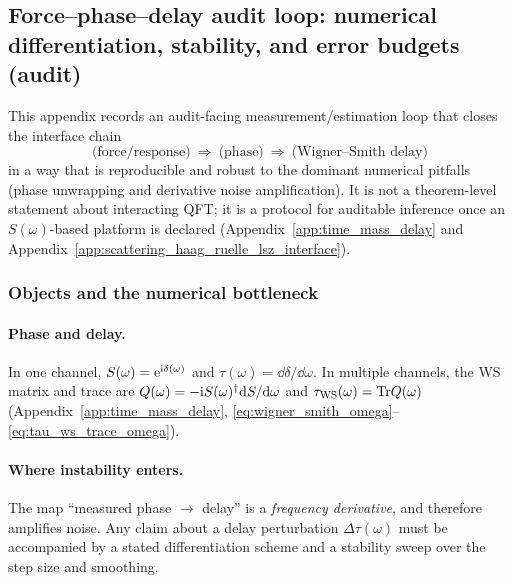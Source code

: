\subsection{Force--phase--delay audit loop: numerical differentiation, stability, and error budgets (audit)}
\label{app:force_phase_delay_audit}

This appendix records an audit-facing measurement/estimation loop that closes the interface chain
\[
\text{(force/response)}\ \Rightarrow\ \text{(phase)}\ \Rightarrow\ \text{(Wigner--Smith delay)}
\]
in a way that is reproducible and robust to the dominant numerical pitfalls (phase unwrapping and derivative noise amplification).
It is not a theorem-level statement about interacting QFT; it is a protocol for auditable inference once an $S(\omega)$-based platform is declared (Appendix~\ref{app:time_mass_delay} and Appendix~\ref{app:scattering_haag_ruelle_lsz_interface}).

\subsubsection{Objects and the numerical bottleneck}
\paragraph{Phase and delay.}
\InterfaceTag In one channel, $S(\omega)=\mathrm{e}^{\mathrm{i}\delta(\omega)}$ and $\tau(\omega)=\dd\delta/\dd\omega$.
In multiple channels, the WS matrix and trace are
$Q(\omega)=-\mathrm{i} S(\omega)^\dagger \mathrm{d} S/\mathrm{d}\omega$ and $\tau_{\mathrm{WS}}(\omega)=\mathrm{Tr} Q(\omega)$ (Appendix~\ref{app:time_mass_delay}, \eqref{eq:wigner_smith_omega}--\eqref{eq:tau_ws_trace_omega}).

\paragraph{Where instability enters.}
\AuditTag The map ``measured phase $\to$ delay'' is a \emph{frequency derivative}, and therefore amplifies noise.
Any claim about a delay perturbation $\Delta\tau(\omega)$ must be accompanied by a stated differentiation scheme and a stability sweep over the step size and smoothing.

